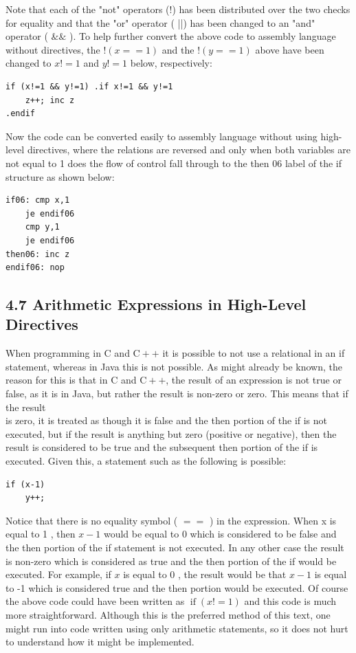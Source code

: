 \documentclass[10pt]{book}
\begin{document}
Note that each of the "not" operators (!) has been distributed over the two checks for equality and that the "or" operator ( ||) has been changed to an "and" operator ( $\& \&$ ). To help further convert the above code to assembly language without directives, the $!(x==1)$ and the $!(y==1)$ above have been changed to $x!=1$ and $y!=1$ below, respectively:

\begin{verbatim}
if (x!=1 && y!=1) .if x!=1 && y!=1
    z++; inc z
.endif
\end{verbatim}

Now the code can be converted easily to assembly language without using high-level directives, where the relations are reversed and only when both variables are not equal to 1 does the flow of control fall through to the then 06 label of the if structure as shown below:

\begin{verbatim}
if06: cmp x,1
    je endif06
    cmp y,1
    je endif06
then06: inc z
endif06: nop
\end{verbatim}

\subsection*{4.7 Arithmetic Expressions in High-Level Directives}
When programming in C and $\mathrm{C}++$ it is possible to not use a relational in an if statement, whereas in Java this is not possible. As might already be known, the reason for this is that in C and $\mathrm{C}++$, the result of an expression is not true or false, as it is in Java, but rather the result is non-zero or zero. This means that if the result\\
is zero, it is treated as though it is false and the then portion of the if is not executed, but if the result is anything but zero (positive or negative), then the result is considered to be true and the subsequent then portion of the if is executed. Given this, a statement such as the following is possible:


\begin{verbatim}
if (x-1)
    y++;
\end{verbatim}

Notice that there is no equality symbol ( $==$ ) in the expression. When x is equal to 1 , then $x-1$ would be equal to 0 which is considered to be false and the then portion of the if statement is not executed. In any other case the result is non-zero which is considered as true and the then portion of the if would be executed. For example, if $x$ is equal to 0 , the result would be that $x-1$ is equal to -1 which is considered true and the then portion would be executed. Of course the above code could have been written as $\operatorname{if}(x!=1)$ and this code is much more straightforward. Although this is the preferred method of this text, one might run into code written using only arithmetic statements, so it does not hurt to understand how it might be implemented.
\end{document}
